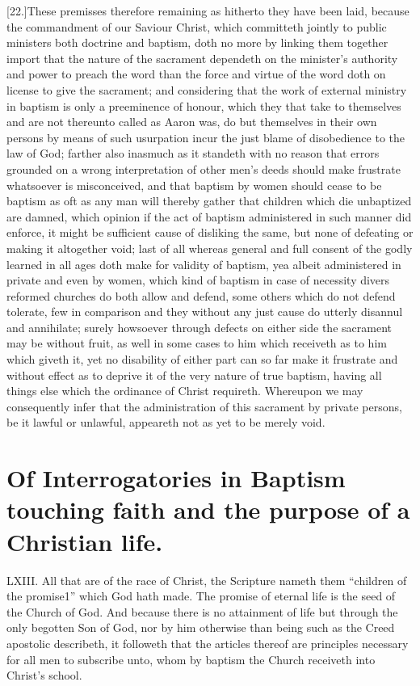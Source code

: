 [22.]These premisses therefore remaining as hitherto they have been laid, because the commandment of our Saviour Christ, which committeth jointly to public ministers both doctrine and baptism, doth no more by linking them together import that the nature of the sacrament dependeth on the minister’s authority and power to preach the word than the force and virtue of the word doth on license to give the sacrament; and considering that the work of external ministry in baptism is only a preeminence of honour, which they that take to themselves and are not thereunto called as Aaron was, do but themselves in their own persons by means of such usurpation incur the just blame of disobedience to the law of God; farther also inasmuch as it standeth with no  reason that errors grounded on a wrong interpretation of other men’s deeds should make frustrate whatsoever is misconceived,
 and that baptism by women should cease to be baptism as oft as any man will thereby gather that children which die unbaptized are damned, which opinion if the act of baptism administered in such manner did enforce, it might be sufficient cause of disliking the same, but none of defeating or making it altogether void; last of all whereas general and full consent of the godly learned in all ages doth make for validity of baptism, yea albeit administered in private and even by women, which kind of baptism in case of necessity divers reformed churches do both allow and defend, some others which do not defend tolerate, few in comparison and they without any just cause do utterly disannul and annihilate; surely howsoever through defects on either side the sacrament may be without fruit, as well in some cases to him which receiveth as to him which giveth it, yet no disability of either part can so far make it frustrate and without effect as to deprive it of the very nature of true baptism, having all things else which the ordinance of Christ requireth. Whereupon we may consequently infer that the administration of this sacrament by private persons, be it lawful or unlawful, appeareth not as yet to be merely void.


\section*{Of Interrogatories in Baptism touching faith and the purpose of a Christian life.}
LXIII. All that are of the race of Christ, the Scripture nameth them “children of the promise1” which God hath made. The promise of eternal life is the seed of the Church of God. And because there is no attainment of life but through the only begotten Son of God, nor by him otherwise than being such as the Creed apostolic describeth, it followeth that the articles thereof are principles necessary for all men to subscribe unto, whom by baptism the Church receiveth into Christ’s school.

